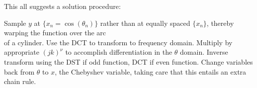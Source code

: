 \documentclass[10pt]{article}
\begin{document}
This all suggests a solution procedure:

\begin{algorithm}
\caption*{\textbf{Chebyshev Derivative via Fourier}}
\begin{algorithmic}[1] %
\STATE Sample $y$ at $\{x_n = \cos(\theta_n)\}$ rather than at equally spaced $\{x_n\}$, thereby warping the function over the arc\\of a cylinder.
\STATE Use the DCT to transform to frequency domain.
\STATE Multiply by appropriate $(jk)^\nu$ to accomplish differentiation in the $\theta$ domain.
\STATE Inverse transform using the DST if odd function, DCT if even function.
\STATE Change variables back from $\theta$ to $x$, the Chebyshev variable, taking care that this entails an extra chain rule.
\end{algorithmic}
\end{algorithm}
\end{document}
